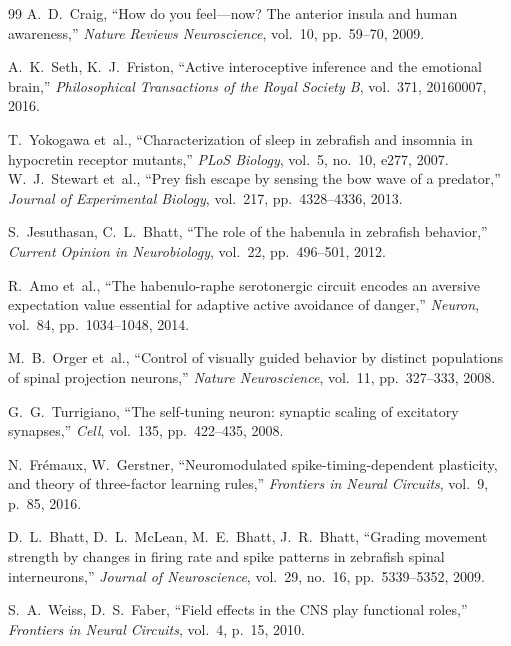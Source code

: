 \documentclass[11pt,a4paper]{article}
\begin{document}
\begin{thebibliography}{99}
  A.~D.~Craig,
  ``How do you feel---now? The anterior insula and human awareness,''
  \textit{Nature Reviews Neuroscience}, vol.~10, pp.~59--70, 2009.

  A.~K.~Seth, K.~J.~Friston,
  ``Active interoceptive inference and the emotional brain,''
  \textit{Philosophical Transactions of the Royal Society B}, vol.~371, 20160007, 2016.

  T.~Yokogawa et~al.,
  ``Characterization of sleep in zebrafish and insomnia in hypocretin receptor mutants,''
  \textit{PLoS Biology}, vol.~5, no.~10, e277, 2007.
  W.~J.~Stewart et~al.,
  ``Prey fish escape by sensing the bow wave of a predator,''
  \textit{Journal of Experimental Biology}, vol.~217, pp.~4328--4336, 2013.

  S.~Jesuthasan, C.~L.~Bhatt,
  ``The role of the habenula in zebrafish behavior,''
  \textit{Current Opinion in Neurobiology}, vol.~22, pp.~496--501, 2012.

  R.~Amo et~al.,
  ``The habenulo-raphe serotonergic circuit encodes an aversive expectation value essential for adaptive active avoidance of danger,''
  \textit{Neuron}, vol.~84, pp.~1034--1048, 2014.

  M.~B.~Orger et~al.,
  ``Control of visually guided behavior by distinct populations of spinal projection neurons,''
  \textit{Nature Neuroscience}, vol.~11, pp.~327--333, 2008.

  G.~G.~Turrigiano,
  ``The self-tuning neuron: synaptic scaling of excitatory synapses,''
  \textit{Cell}, vol.~135, pp.~422--435, 2008.

  N.~Fr\'emaux, W.~Gerstner,
  ``Neuromodulated spike-timing-dependent plasticity, and theory of
  three-factor learning rules,''
  \textit{Frontiers in Neural Circuits}, vol.~9, p.~85, 2016.

  D.~L.~Bhatt, D.~L.~McLean, M.~E.~Bhatt, J.~R.~Bhatt,
  ``Grading movement strength by changes in firing rate and spike patterns
  in zebrafish spinal interneurons,''
  \textit{Journal of Neuroscience}, vol.~29, no.~16, pp.~5339--5352, 2009.

  S.~A.~Weiss, D.~S.~Faber,
  ``Field effects in the CNS play functional roles,''
  \textit{Frontiers in Neural Circuits}, vol.~4, p.~15, 2010.

\end{thebibliography}
\end{document}
